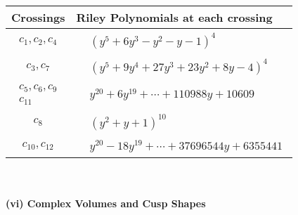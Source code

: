 \documentclass[1p]{elsarticle_modified}
\theoremstyle{definition}
\begin{document}
\begin{tabular}{m{50pt}|m{274pt}}
Crossings & \hspace{64pt}Riley Polynomials at each crossing \\
\hline $$\begin{aligned}c_{1},c_{2},c_{4}\end{aligned}$$&$\begin{aligned}
&(y^5+6 y^3- y^2- y-1)^4
\end{aligned}$\\
\hline $$\begin{aligned}c_{3},c_{7}\end{aligned}$$&$\begin{aligned}
&(y^5+9 y^4+27 y^3+23 y^2+8 y-4)^4
\end{aligned}$\\
\hline $$\begin{aligned}c_{5},c_{6},c_{9}\\c_{11}\end{aligned}$$&$\begin{aligned}
&y^{20}+6 y^{19}+\cdots+110988 y+10609
\end{aligned}$\\
\hline $$\begin{aligned}c_{8}\end{aligned}$$&$\begin{aligned}
&(y^2+y+1)^{10}
\end{aligned}$\\
\hline $$\begin{aligned}c_{10},c_{12}\end{aligned}$$&$\begin{aligned}
&y^{20}-18 y^{19}+\cdots+37696544 y+6355441
\end{aligned}$\\
\hline
\end{tabular}\\~\\
\newpage\flushleft \textbf{(vi) Complex Volumes and Cusp Shapes}
\end{document}
